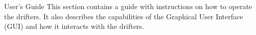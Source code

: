 \begin{customAppendixPage}{User's Guide}
\label{sec:usersGuide}
This section contains a guide with instructions on how to operate the drifters.  It also describes the capabilities of the Graphical User Interface (GUI) and how it interacts with the drifters.
\end{customAppendixPage}
\renewcommand*{\thepage}{\thesection-\arabic{page}}

